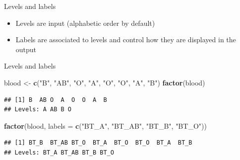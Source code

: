 \documentclass[ignorenonframetext,]{beamer}
\newenvironment{Shaded}{\begin{snugshade}}{\end{snugshade}}
\newcommand{\DataTypeTok}[1]{\textcolor[rgb]{0.13,0.29,0.53}{#1}}
\newcommand{\KeywordTok}[1]{\textcolor[rgb]{0.13,0.29,0.53}{\textbf{#1}}}
\newcommand{\NormalTok}[1]{#1}
\newcommand{\StringTok}[1]{\textcolor[rgb]{0.31,0.60,0.02}{#1}}
\begin{document}
\begin{frame}{Levels and labels}
\protect\hypertarget{levels-and-labels}{}

\begin{itemize}
\item
  Levels are input (alphabetic order by default)
\item
  Labels are associated to levels and control how they are displayed in
  the output
\end{itemize}

\end{frame}

\begin{frame}[fragile]{Levels and labels}
\protect\hypertarget{levels-and-labels-1}{}

\begin{Shaded}
\begin{Highlighting}[]
\NormalTok{blood <-}\StringTok{ }\KeywordTok{c}\NormalTok{(}\StringTok{"B"}\NormalTok{, }\StringTok{"AB"}\NormalTok{, }\StringTok{"O"}\NormalTok{, }\StringTok{"A"}\NormalTok{, }\StringTok{"O"}\NormalTok{, }\StringTok{"O"}\NormalTok{, }\StringTok{"A"}\NormalTok{, }\StringTok{"B"}\NormalTok{) }
\KeywordTok{factor}\NormalTok{(blood)}
\end{Highlighting}
\end{Shaded}

\begin{verbatim}
## [1] B  AB O  A  O  O  A  B 
## Levels: A AB B O
\end{verbatim}

\begin{Shaded}
\begin{Highlighting}[]
\KeywordTok{factor}\NormalTok{(blood, }
         \DataTypeTok{labels =} \KeywordTok{c}\NormalTok{(}\StringTok{"BT_A"}\NormalTok{, }\StringTok{"BT_AB"}\NormalTok{, }\StringTok{"BT_B"}\NormalTok{, }\StringTok{"BT_O"}\NormalTok{))}
\end{Highlighting}
\end{Shaded}

\begin{verbatim}
## [1] BT_B  BT_AB BT_O  BT_A  BT_O  BT_O  BT_A  BT_B 
## Levels: BT_A BT_AB BT_B BT_O
\end{verbatim}

\end{frame}
\end{document}
